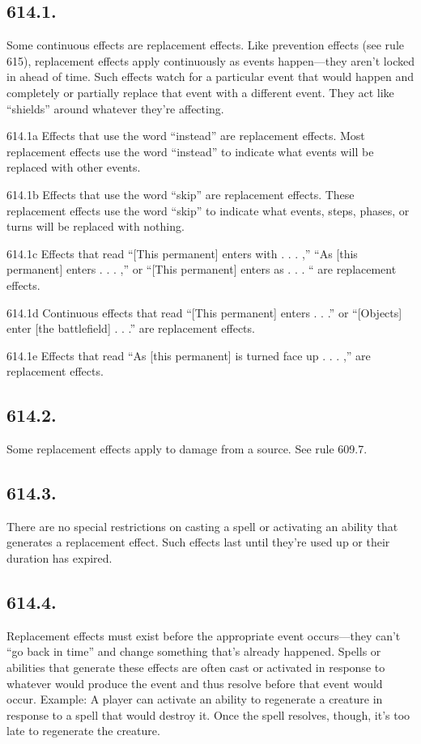 \subsection*{614.1.}
Some continuous effects are replacement effects. Like prevention effects (see rule 615), replacement effects apply continuously as events happen—they aren’t locked in ahead of time. Such effects watch for a particular event that would happen and completely or partially replace that event with a different event. They act like “shields” around whatever they’re affecting.

614.1a Effects that use the word “instead” are replacement effects. Most replacement effects use the word “instead” to indicate what events will be replaced with other events.

614.1b Effects that use the word “skip” are replacement effects. These replacement effects use the word “skip” to indicate what events, steps, phases, or turns will be replaced with nothing.

614.1c Effects that read “[This permanent] enters with . . . ,” “As [this permanent] enters . . . ,” or “[This permanent] enters as . . . “ are replacement effects.

614.1d Continuous effects that read “[This permanent] enters . . .” or “[Objects] enter [the battlefield] . . .” are replacement effects.

614.1e Effects that read “As [this permanent] is turned face up . . . ,” are replacement effects.

\subsection*{614.2.}
Some replacement effects apply to damage from a source. See rule 609.7.

\subsection*{614.3.}
There are no special restrictions on casting a spell or activating an ability that generates a replacement effect. Such effects last until they’re used up or their duration has expired.

\subsection*{614.4.}
Replacement effects must exist before the appropriate event occurs—they can’t “go back in time” and change something that’s already happened. Spells or abilities that generate these effects are often cast or activated in response to whatever would produce the event and thus resolve before that event would occur.
Example: A player can activate an ability to regenerate a creature in response to a spell that would destroy it. Once the spell resolves, though, it’s too late to regenerate the creature.

